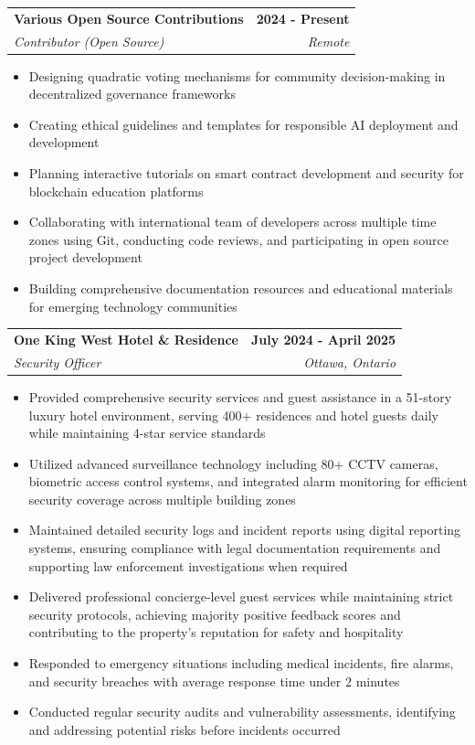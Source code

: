 \documentclass[letterpaper,11pt]{article}
\makeatletter
\newcommand{\resumeItem}[1]{
  \item\small{
    {#1 \vspace{-2pt}}
  }
}
\newcommand{\resumeSubheading}[4]{
  \vspace{-2pt}\item
    \begin{tabular*}{1.0\textwidth}[t]{l@{\extracolsep{\fill}}r}
      \textbf{#1} & \textbf{\small #2} \\
      \textit{\small#3} & \textit{\small #4} \\
    \end{tabular*}\vspace{-7pt}
}
\newcommand{\resumeItemListStart}{\begin{itemize}}
\newcommand{\resumeItemListEnd}{\end{itemize}\vspace{-5pt}}
\makeatother
\begin{document}
    \resumeSubheading
      {Various Open Source Contributions}{2024 - Present}
      {Contributor (Open Source)}{Remote}
      \resumeItemListStart
        \resumeItem{Designing quadratic voting mechanisms for community decision-making in decentralized governance frameworks}
        \resumeItem{Creating ethical guidelines and templates for responsible AI deployment and development}
        \resumeItem{Planning interactive tutorials on smart contract development and security for blockchain education platforms}
        \resumeItem{Collaborating with international team of developers across multiple time zones using Git, conducting code reviews, and participating in open source project development}
        \resumeItem{Building comprehensive documentation resources and educational materials for emerging technology communities}
    \resumeItemListEnd

    \resumeSubheading
      {One King West Hotel \& Residence}{July 2024 - April 2025}
      {Security Officer}{Ottawa, Ontario}
      \resumeItemListStart
        \resumeItem{Provided comprehensive security services and guest assistance in a 51-story luxury hotel environment, serving 400+ residences and hotel guests daily while maintaining 4-star service standards}
        \resumeItem{Utilized advanced surveillance technology including 80+ CCTV cameras, biometric access control systems, and integrated alarm monitoring for efficient security coverage across multiple building zones}
        \resumeItem{Maintained detailed security logs and incident reports using digital reporting systems, ensuring compliance with legal documentation requirements and supporting law enforcement investigations when required}
        \resumeItem{Delivered professional concierge-level guest services while maintaining strict security protocols, achieving majority positive feedback scores and contributing to the property's reputation for safety and hospitality}
        \resumeItem{Responded to emergency situations including medical incidents, fire alarms, and security breaches with average response time under 2 minutes}
        \resumeItem{Conducted regular security audits and vulnerability assessments, identifying and addressing potential risks before incidents occurred}
    \resumeItemListEnd
\end{document}
